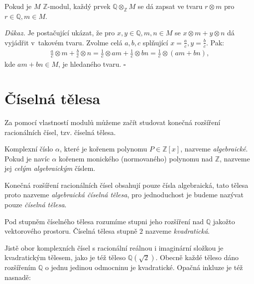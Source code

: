 \documentclass[12pt]{report}
\begin{document}
\begin{veta}\label{qtensor}
Pokud je $M$ $\mathbb{Z}$-modul, každý prvek $\mathbb{Q} \otimes_{\mathbb{Z}} M$ se dá zapsat ve tvaru $r \otimes m$ pro $r \in \mathbb{Q}, m \in M$.
\end{veta}

\textit{Důkaz.} Je postačující ukázat, že pro $x,y \in \mathbb{Q}, m,n \in M$ se $x \otimes m + y \otimes n$ dá vyjádřit v~takovém tvaru. Zvolme celá $a,b,c$ splňující $x = \frac{a}{c}, y = \frac{b}{c}$. Pak:
\begin{align*}
\frac{a}{c} \otimes m + \frac{b}{c} \otimes n = \frac{1}{c} \otimes am + \frac{1}{c} \otimes bn = \frac{1}{c} \otimes (am+bn),
\end{align*}
kde $am+bn \in M$, je hledaného tvaru. \hfill $\square$



\section{Číselná tělesa}

Za pomocí vlastností modulů můžeme začít studovat konečná rozšíření racionálních čísel, tzv. číselná tělesa.

\begin{definice}
Komplexní číslo $\alpha$, které je kořenem polynomu $P \in \mathbb{Z}[x]$, nazveme \textit{algebraické}. Pokud je navíc $\alpha$ kořenem monického (normovaného) polynomu nad $\mathbb{Z}$, nazveme jej \textit{celým algebraickým} číslem.
\end{definice}

\begin{definice}
Konečná rozšíření racionálních čísel obsahují pouze čísla algebraická, tato tělesa proto nazveme \textit{algebraická číselná tělesa}, pro jednoduchost je budeme nazývat pouze \textit{číselná tělesa}.
\end{definice}


\begin{definice}
Pod stupněm číselného tělesa rozumíme stupni jeho rozšíření nad $\mathbb{Q}$ jakožto vektorového prostoru. Číselná tělesa stupně $2$ nazveme \textit{kvadratická}.
\end{definice}

Jistě obor komplexních čísel s racionální reálnou i imaginární složkou je kvadratickým tělesem, jako je též těleso $\mathbb{Q}(\sqrt{2})$. Obecně každé těleso dáno rozšířením $\mathbb{Q}$ o jednu jedinou odmocninu je kvadratické. Opačná inkluze je též nasnadě:
\end{document}
